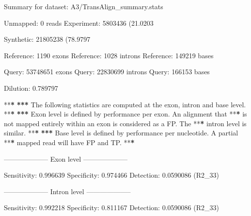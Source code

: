 \documentclass[]{article}
\newenvironment{Shaded}{\begin{snugshade}}{\end{snugshade}}
\newcommand{\DecValTok}[1]{\textcolor[rgb]{0.00,0.00,0.81}{{#1}}}
\newcommand{\FloatTok}[1]{\textcolor[rgb]{0.00,0.00,0.81}{{#1}}}
\newcommand{\StringTok}[1]{\textcolor[rgb]{0.31,0.60,0.02}{{#1}}}
\newcommand{\ErrorTok}[1]{\textbf{{#1}}}
\newcommand{\NormalTok}[1]{{#1}}
\begin{document}
\begin{Shaded}
\begin{Highlighting}[]
\NormalTok{Summary for dataset:}\StringTok{ }\NormalTok{A3/TransAlign_summary.stats}

   \NormalTok{Unmapped:}\StringTok{   }\DecValTok{0} \NormalTok{reads}
   \NormalTok{Experiment:}\StringTok{ }\DecValTok{5803436} \NormalTok{(}\FloatTok{21.0203}\NormalTok{%
   \NormalTok{Synthetic:}\StringTok{  }\DecValTok{21805238} \NormalTok{(}\FloatTok{78.9797}\NormalTok{%

   \NormalTok{Reference:}\StringTok{  }\DecValTok{1190} \NormalTok{exons}
   \NormalTok{Reference:}\StringTok{  }\DecValTok{1028} \NormalTok{introns}
   \NormalTok{Reference:}\StringTok{  }\DecValTok{149219} \NormalTok{bases}

   \NormalTok{Query:}\StringTok{      }\DecValTok{53748651} \NormalTok{exons}
   \NormalTok{Query:}\StringTok{      }\DecValTok{22830699} \NormalTok{introns}
   \NormalTok{Query:}\StringTok{      }\DecValTok{166153} \NormalTok{bases}

   \NormalTok{Dilution:}\StringTok{   }\FloatTok{0.789797}

   \NormalTok{**}\ErrorTok{*}
\StringTok{   }\ErrorTok{***}\StringTok{ }\NormalTok{The following statistics are computed at the exon, intron and base level.}
   \NormalTok{**}\ErrorTok{*}
\StringTok{   }\ErrorTok{***}\StringTok{ }\NormalTok{Exon level is defined by performance per exon. An alignment that}
   \NormalTok{**}\ErrorTok{*}\StringTok{ }\NormalTok{is not mapped entirely within an exon is considered as a FP. The}
   \NormalTok{**}\ErrorTok{*}\StringTok{ }\NormalTok{intron level is similar.}
   \NormalTok{**}\ErrorTok{*}
\StringTok{   }\ErrorTok{***}\StringTok{ }\NormalTok{Base level is defined by performance per nucleotide. A partial}
   \NormalTok{**}\ErrorTok{*}\StringTok{ }\NormalTok{mapped read will have FP and TP.}
   \NormalTok{**}\ErrorTok{*}

\StringTok{   }\NormalTok{--------------------}\StringTok{ }\NormalTok{Exon level --------------------}

\StringTok{   }\NormalTok{Sensitivity:}\StringTok{ }\FloatTok{0.996639}
   \NormalTok{Specificity:}\StringTok{ }\FloatTok{0.974466}
   \NormalTok{Detection:}\StringTok{   }\FloatTok{0.0590086} \NormalTok{(R2_33)}

   \NormalTok{--------------------}\StringTok{ }\NormalTok{Intron level --------------------}

\StringTok{   }\NormalTok{Sensitivity:}\StringTok{ }\FloatTok{0.992218}
   \NormalTok{Specificity:}\StringTok{ }\FloatTok{0.811167}
   \NormalTok{Detection:}\StringTok{   }\FloatTok{0.0590086} \NormalTok{(R2_33)}

}}
\end{Highlighting}
\end{Shaded}
\end{document}
